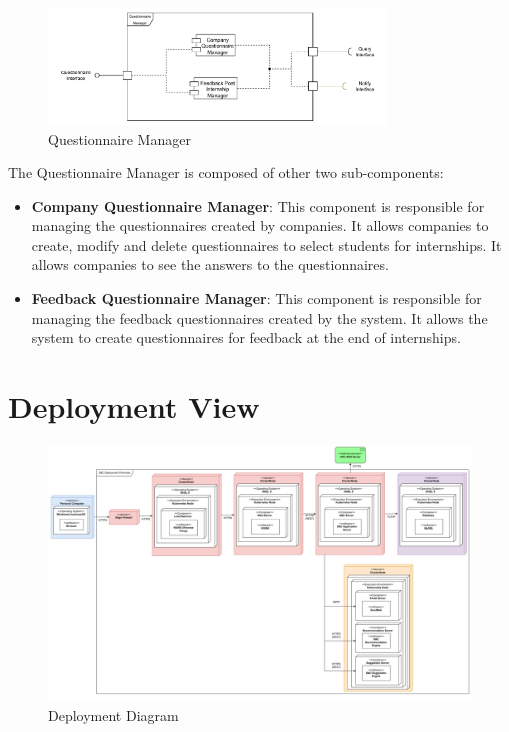 \begin{figure}[H]
      \centering
      \includegraphics[width=0.8\textwidth]{Images/Questionnaire_Architecture.pdf}
      \caption{Questionnaire Manager}
      \label{questionnaire-manager-arch}
\end{figure}

\par The Questionnaire Manager is composed of other two sub-components:
\begin{itemize}
      \item \textbf{Company Questionnaire Manager}: This component is responsible for managing the questionnaires created by companies.
            It allows companies to create, modify and delete questionnaires to select students for internships.
            It allows companies to see the answers to the questionnaires.
      \item \textbf{Feedback Questionnaire Manager}: This component is responsible for managing the feedback questionnaires created by the system.
            It allows the system to create questionnaires for feedback at the end of internships.
\end{itemize}

\section{Deployment View}
\label{sec:deployment-view}%

\begin{figure}[H]
      \centering
      \includegraphics[width=1.0\textwidth]{Images/Deployment_Diagram.pdf}
      \caption{Deployment Diagram}
      \label{fig:deployment-diagram}
\end{figure}

